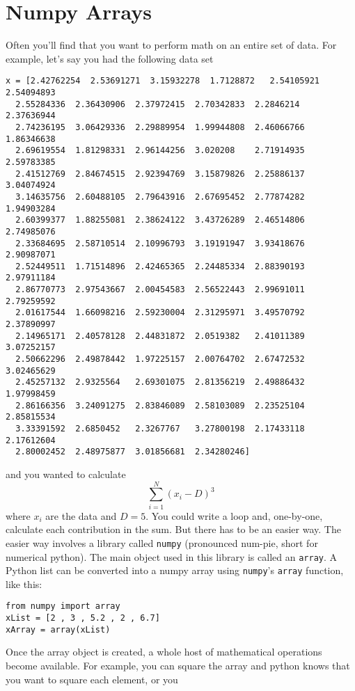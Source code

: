 \section{Numpy Arrays}
Often you'll find that you want to perform math on an entire set of
data.  For example, let's say you had the following data set
\begin{Verbatim}
x = [2.42762254  2.53691271  3.15932278  1.7128872   2.54105921  2.54094893
  2.55284336  2.36430906  2.37972415  2.70342833  2.2846214   2.37636944
  2.74236195  3.06429336  2.29889954  1.99944808  2.46066766  1.86346638
  2.69619554  1.81298331  2.96144256  3.020208    2.71914935  2.59783385
  2.41512769  2.84674515  2.92394769  3.15879826  2.25886137  3.04074924
  3.14635756  2.60488105  2.79643916  2.67695452  2.77874282  1.94903284
  2.60399377  1.88255081  2.38624122  3.43726289  2.46514806  2.74985076
  2.33684695  2.58710514  2.10996793  3.19191947  3.93418676  2.90987071
  2.52449511  1.71514896  2.42465365  2.24485334  2.88390193  2.97911184
  2.86770773  2.97543667  2.00454583  2.56522443  2.99691011  2.79259592
  2.01617544  1.66098216  2.59230004  2.31295971  3.49570792  2.37890997
  2.14965171  2.40578128  2.44831872  2.0519382   2.41011389  3.07252157
  2.50662296  2.49878442  1.97225157  2.00764702  2.67472532  3.02465629
  2.45257132  2.9325564   2.69301075  2.81356219  2.49886432  1.97998459
  2.86166356  3.24091275  2.83846089  2.58103089  2.23525104  2.85815534
  3.33391592  2.6850452   2.3267767   3.27800198  2.17433118  2.17612604
  2.80002452  2.48975877  3.01856681  2.34280246]
\end{Verbatim}
and you wanted to calculate
\begin{equation}
\sum_{i=1}^N (x_i - D)^3
\end{equation}
where $x_i$ are the data and $D = 5$.  You could write a loop and,
one-by-one, calculate each contribution in the sum.  But there has to
be an easier way.  The easier way involves a library called
\texttt{numpy} (pronounced num-pie, short for numerical python).  The main object used in this
library is called an \texttt{array}.  A Python list can be converted
into a numpy array using \texttt{numpy}'s \texttt{array} function, like
this:
\begin{Verbatim}
from numpy import array
xList = [2 , 3 , 5.2 , 2 , 6.7]
xArray = array(xList)
\end{Verbatim}
Once the array object is created, a whole host of mathematical
operations become available.  For example, you can square the
array and python knows that you want to square each element, or you
